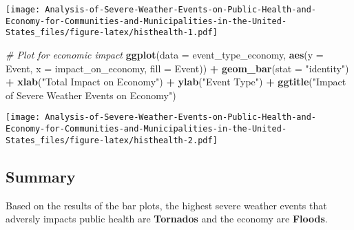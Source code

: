 \documentclass[
]{article}
\newenvironment{Shaded}{\begin{snugshade}}{\end{snugshade}}
\newcommand{\CommentTok}[1]{\textcolor[rgb]{0.56,0.35,0.01}{\textit{#1}}}
\newcommand{\DataTypeTok}[1]{\textcolor[rgb]{0.13,0.29,0.53}{#1}}
\newcommand{\KeywordTok}[1]{\textcolor[rgb]{0.13,0.29,0.53}{\textbf{#1}}}
\newcommand{\NormalTok}[1]{#1}
\newcommand{\OperatorTok}[1]{\textcolor[rgb]{0.81,0.36,0.00}{\textbf{#1}}}
\newcommand{\StringTok}[1]{\textcolor[rgb]{0.31,0.60,0.02}{#1}}
\begin{document}
\texttt{[image: Analysis-of-Severe-Weather-Events-on-Public-Health-and-Economy-for-Communities-and-Municipalities-in-the-United-States\_files/figure-latex/histhealth-1.pdf]}

\begin{Shaded}
\begin{Highlighting}[]
\CommentTok{# Plot for economic impact}
\KeywordTok{ggplot}\NormalTok{(}\DataTypeTok{data =}\NormalTok{ event_type_economy, }\KeywordTok{aes}\NormalTok{(}\DataTypeTok{y =}\NormalTok{ Event, }\DataTypeTok{x =}\NormalTok{ impact_on_economy, }\DataTypeTok{fill =}\NormalTok{ Event)) }\OperatorTok{+}\StringTok{ }\KeywordTok{geom_bar}\NormalTok{(}\DataTypeTok{stat =} \StringTok{"identity"}\NormalTok{) }\OperatorTok{+}\StringTok{ }\KeywordTok{xlab}\NormalTok{(}\StringTok{"Total Impact on Economy"}\NormalTok{) }\OperatorTok{+}\StringTok{ }\KeywordTok{ylab}\NormalTok{(}\StringTok{"Event Type"}\NormalTok{) }\OperatorTok{+}\StringTok{ }\KeywordTok{ggtitle}\NormalTok{(}\StringTok{"Impact of Severe Weather Events on Economy"}\NormalTok{)}
\end{Highlighting}
\end{Shaded}

\texttt{[image: Analysis-of-Severe-Weather-Events-on-Public-Health-and-Economy-for-Communities-and-Municipalities-in-the-United-States\_files/figure-latex/histhealth-2.pdf]}

\hypertarget{summary}{%
\subsection{Summary}\label{summary}}

Based on the results of the bar plots, the highest severe weather events
that adversly impacts public health are \textbf{Tornados} and the
economy are \textbf{Floods}.
\end{document}
